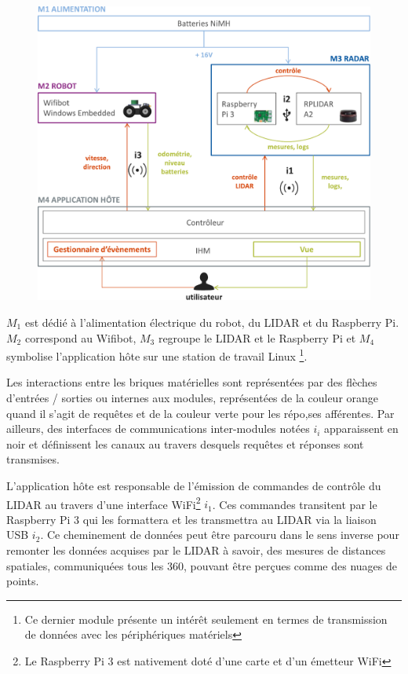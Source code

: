 \begin{figure}[h]
  \centering
    \includegraphics[width=.9\linewidth]{figures/archi-phy}  
  \label{fig:archiphy}
\end{figure}

$M_{1}$ est dédié à l'alimentation électrique du robot, du LIDAR et du Raspberry Pi.
$M_{2}$ correspond au Wifibot, $M_{3}$ regroupe le LIDAR et le Raspberry Pi et $M_{4}$ symbolise l'application hôte sur une station de travail Linux
\footnote{Ce dernier module présente un intérêt seulement en termes de transmission de données avec les périphériques matériels}.

Les interactions entre les briques matérielles sont représentées par des flèches d'entrées / sorties ou internes aux modules, représentées de la couleur orange quand il s'agit de requêtes et de la couleur verte pour 
les répo,ses afférentes. 
Par ailleurs, des interfaces de communications inter-modules notées $i_{i}$ apparaissent en noir et définissent les canaux au travers desquels requêtes et réponses sont transmises. 

L'application hôte est responsable de l'émission de commandes de contrôle du LIDAR au travers d'une interface WiFi\footnote{Le Raspberry Pi 3 est nativement doté d'une carte et d'un émetteur WiFi} $i_{1}$. 
Ces commandes transitent par le Raspberry Pi 3 qui les formattera et les transmettra au LIDAR via la liaison USB $i_{2}$. 
Ce cheminement de données peut être parcouru dans le sens inverse pour remonter les données acquises par le LIDAR à savoir, 
des mesures de distances spatiales, communiquées tous les 360\degre, pouvant être perçues comme des nuages de points. 

